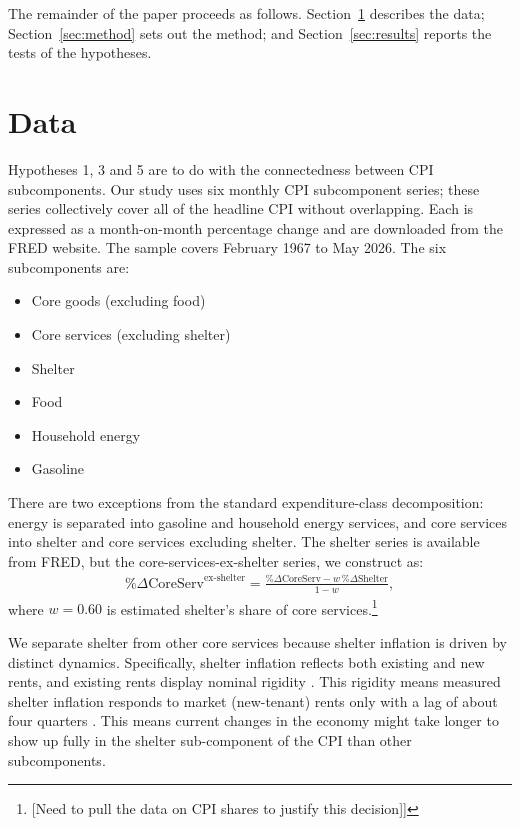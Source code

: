 \documentclass{article}
\begin{document}
The remainder of the paper proceeds as follows.
Section~\ref{sec:data} describes the data; Section~\ref{sec:method} sets out the method; and
Section~\ref{sec:results} reports the tests of the hypotheses.

\section{Data}\label{sec:data}

Hypotheses 1, 3 and 5 are to do with the connectedness between CPI subcomponents. Our study uses six monthly CPI subcomponent series; these series collectively  
cover all of the
headline CPI without overlapping. Each is expressed as a month-on-month percentage change and are downloaded from the FRED website. The sample covers
February 1967 to May 2026. The six subcomponents are:
\begin{itemize}
    \item Core goods (excluding food)
    \item Core services (excluding shelter)
    \item Shelter
    \item Food
    \item Household energy
    \item Gasoline
\end{itemize}

There are two exceptions from the standard expenditure-class decomposition: energy is separated into gasoline and household energy services, and core services into shelter and core services excluding shelter. The shelter series is available from FRED, but the core-services-ex-shelter series, we construct as:
\begin{align}
\%\Delta\text{CoreServ}^{\text{ex-shelter}}
  = \frac{\%\Delta\text{CoreServ} - w\,\%\Delta\text{Shelter}}{1-w},
\end{align}
where $w=0.60$ is estimated shelter's share of core services.\footnote{[Need to pull the data on CPI shares to justify this decision]]}

We separate shelter from other core services because shelter inflation is driven by distinct dynamics. Specifically, shelter inflation reflects both existing and new rents, and existing rents display nominal rigidity  \citep{genesove2003}.  This rigidity means measured shelter inflation responds to market (new-tenant) rents only with a lag of about four quarters \citep{adamsetal2024}. This means current changes in the economy might take longer to show up fully in the shelter sub-component of the CPI than other subcomponents.
\end{document}
